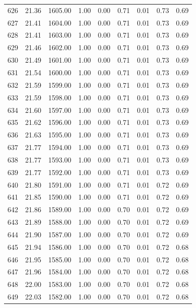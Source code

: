\documentclass{article}\usepackage[]{graphicx}\usepackage[]{color}
\begin{document}
\begin{longtable}{rrrrrrrrr}
  626 & 21.36 & 1605.00 & 1.00 & 0.00 & 0.71 & 0.01 & 0.73 & 0.69 \\ 
  627 & 21.41 & 1604.00 & 1.00 & 0.00 & 0.71 & 0.01 & 0.73 & 0.69 \\ 
  628 & 21.41 & 1603.00 & 1.00 & 0.00 & 0.71 & 0.01 & 0.73 & 0.69 \\ 
  629 & 21.46 & 1602.00 & 1.00 & 0.00 & 0.71 & 0.01 & 0.73 & 0.69 \\ 
  630 & 21.49 & 1601.00 & 1.00 & 0.00 & 0.71 & 0.01 & 0.73 & 0.69 \\ 
  631 & 21.54 & 1600.00 & 1.00 & 0.00 & 0.71 & 0.01 & 0.73 & 0.69 \\ 
  632 & 21.59 & 1599.00 & 1.00 & 0.00 & 0.71 & 0.01 & 0.73 & 0.69 \\ 
  633 & 21.59 & 1598.00 & 1.00 & 0.00 & 0.71 & 0.01 & 0.73 & 0.69 \\ 
  634 & 21.60 & 1597.00 & 1.00 & 0.00 & 0.71 & 0.01 & 0.73 & 0.69 \\ 
  635 & 21.62 & 1596.00 & 1.00 & 0.00 & 0.71 & 0.01 & 0.73 & 0.69 \\ 
  636 & 21.63 & 1595.00 & 1.00 & 0.00 & 0.71 & 0.01 & 0.73 & 0.69 \\ 
  637 & 21.77 & 1594.00 & 1.00 & 0.00 & 0.71 & 0.01 & 0.73 & 0.69 \\ 
  638 & 21.77 & 1593.00 & 1.00 & 0.00 & 0.71 & 0.01 & 0.73 & 0.69 \\ 
  639 & 21.77 & 1592.00 & 1.00 & 0.00 & 0.71 & 0.01 & 0.73 & 0.69 \\ 
  640 & 21.80 & 1591.00 & 1.00 & 0.00 & 0.71 & 0.01 & 0.72 & 0.69 \\ 
  641 & 21.85 & 1590.00 & 1.00 & 0.00 & 0.71 & 0.01 & 0.72 & 0.69 \\ 
  642 & 21.86 & 1589.00 & 1.00 & 0.00 & 0.70 & 0.01 & 0.72 & 0.69 \\ 
  643 & 21.89 & 1588.00 & 1.00 & 0.00 & 0.70 & 0.01 & 0.72 & 0.69 \\ 
  644 & 21.90 & 1587.00 & 1.00 & 0.00 & 0.70 & 0.01 & 0.72 & 0.69 \\ 
  645 & 21.94 & 1586.00 & 1.00 & 0.00 & 0.70 & 0.01 & 0.72 & 0.68 \\ 
  646 & 21.95 & 1585.00 & 1.00 & 0.00 & 0.70 & 0.01 & 0.72 & 0.68 \\ 
  647 & 21.96 & 1584.00 & 1.00 & 0.00 & 0.70 & 0.01 & 0.72 & 0.68 \\ 
  648 & 22.00 & 1583.00 & 1.00 & 0.00 & 0.70 & 0.01 & 0.72 & 0.68 \\ 
  649 & 22.03 & 1582.00 & 1.00 & 0.00 & 0.70 & 0.01 & 0.72 & 0.68 \\ 

\end{longtable}
\end{document}
